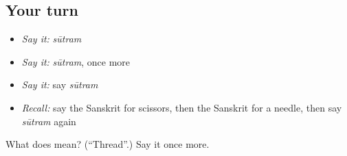 \subsection*{Your turn}
\begin{itemize}
\raggedright
  \item \emph{Say it:} \emph{sūtram}
  \item \emph{Say it:} \emph{sūtram}, once more
  \item \emph{Say it:} say \emph{sūtram}
  \item \emph{Recall:} say the Sanskrit for scissors, then the Sanskrit for a needle, then say \emph{sūtram} again
\end{itemize}

\begin{tcolorbox}[breakable,colback=teal!4,colframe=teal!35!black,title={Before you move on}]
What does  mean? (\textquotedblleft{}Thread\textquotedblright{}.) Say it once more.
\end{tcolorbox}
